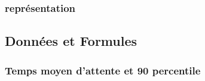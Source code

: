 \documentclass[a4paper,11pt]{article}
\begin{document}
	\subsubsection{représentation}
	\subsection{Données et Formules}
		\subsubsection{Temps moyen d'attente et 90 percentile}
\end{document}
